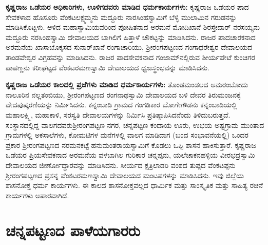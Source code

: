 \textbf{ಕೃಷ್ಣರಾಜ ಒಡೆಯರ ಅಧಿಕಾರಿಗಳು, ಊಳಿಗದವರು ಮಾಡಿದ ಧರ್ಮಕಾರ್ಯಗಳು: } ಕೃಷ್ಣರಾಜ ಒಡೆಯರ ಪಾದ ಸೇವಕಳಾದ ಹೊಸೂರು ವೆಂಕಟಲಕ್ಷ್ಮಮ್ಮನು ಮದ್ದೂರು ನಾರಸಿಂಹಸ್ವಾಮಿಗೆ ಬೆಳ್ಳಿ ಮುಲಾಮಿನ ಗರುಡನನ್ನು ಮಾಡಿಸಿ\-ಕೊಟ್ಟಳು. ಆಳಿದ ಮಹಾಸ್ವಾಮಿಯವರಿಂದ ಪೋಷಿತನಾದ ಅರಮನೆ ಮೋದಿಖಾನೆ ಶಿರಸ್ತೇದಾರ್​ ನರಸಯ್ಯನು ಮದ್ದೂರು ನರಸಿಂಹಸ್ವಾಮಿ ದೇವಾಲಯದ ಬಾಗಿಲಿಗೆ ಹಿತ್ತಾಳೆ ಚೌಕಟ್ಟನ್ನು ಮಾಡಿಸಿದನು. ರಾಜರ ಪಾದಚಾರಕನಾದ ಅರಮನೆಯ ಖಾಸಾಬೊಕ್ಕಸದ ಸುನಾರ್​ಖಾನೆ ರಂಗಾಚಾರಿಯು, ಶ‍್ರೀರಂಗಪಟ್ಟಣದ ಗಂಗಾಧರೇಶ್ವರ ದೇವಾಲಯದ ತಾಂಡವೇಶ್ವರ ವಿಗ್ರಹವನ್ನು ಮಾಡಿಸಿದನು. ರಾಜರ ಪಾದಸೇವಕನಾದ ಗಂಜಾಮ್‌ನಲ್ಲಿರುವ ಶೀರ್ಯಪೇಟೆ ಕುಂಚಿಗರ ಪಾಪಣ್ಣನು ಕರೀಘಟ್ಟದ ವೆಂಕಟರಮಣಸ್ವಾಮಿ ದೇವಾಲಯದ ಧ್ವಜಸ್ಥಂಭವನ್ನು ಮಾಡಿಸಿದನು.

\textbf{ಕೃಷ್ಣರಾಜ ಒಡೆಯರ ಕಾಲದಲ್ಲಿ ಪ್ರಜೆಗಳು ಮಾಡಿದ ಧರ್ಮಕಾರ್ಯಗಳು: } ತೊಂಡಮಂಡಲದ ಅಮರಂಬೋದು ನಾಲೂರಿನ ನಲ್ಲತಂಬಿಯು, ಶ‍್ರೀರಂಗಪಟ್ಟಣದ ರಂಗನಾಥಸ್ವಾಮಿ ದೇವಾಲಯದ ಬಳಿ ದೇವರ ತಿರುಮಂಜನಕ್ಕೆ ವೇದಪುಷ್ಕರಣಿ\-ಯನ್ನು ನಿರ್ಮಿಸಿದನು. ಕನ್ನಂಬಾಡಿ ಗ್ರಾಮದ ಗಂಗಡಿಕಾರ ಬೋಗೇಗೌಡನು ಕನ್ನಂಬಾಡಿಯಲ್ಲಿ ಮಹಾಲಕ್ಷ್ಮಿ, ಮಹಾಕಾಳಿ, ಸರಸ್ವತಿ ದೇವಾಲಯಗಳನ್ನು ನಿರ್ಮಿಸಿ ಪ್ರತಿಷ್ಠಾಪಿಸಿದನೆಂದು ತಿಳಿದುಬರುತ್ತದೆ. ಸಂಸ್ಥಾನದಲ್ಲಿದ್ದ ವಾಲಗದವರು\break ಶ‍್ರೀರಂಗಪಟ್ಟಣ ನಗರ, ಚನ್ನಪಟ್ಟಣ ಕಂದಾಯ ಊರು, ಉಭಯ ಅಷ್ಟಗ್ರಾಮ ಮುಂತಾದ ಗ್ರಾಮಗಳಲ್ಲಿ ಅಕಸಾಲೆಗಳು, ಕೋಮಟಿಗಳ ಮನೆಗಳಲ್ಲಿ ವಾಲಗ ಮಾಡಿದಾಗ (ಬಂದ ಸಂಭಾವನೆಯಲ್ಲಿ) ಒಂದರ ಪ್ರಕಾರ ಶ‍್ರೀರಂಗಪಟ್ಟಣದ ನರಮನಕಟ್ಟೆ ಹನುಮಂತರಾಯಸ್ವಾಮಿಗೆ ಕೊಡಲು ಒಪ್ಪಿ ಶಾಸನ ಹಾಕಿಸುತ್ತಾರೆ. ಕೃಷ್ಣರಾಜ ಒಡೆಯರ ಪ್ರಿಯಸೇವಕನಾದ ಅರಮನೆಯ ವಳಬಾಗಿಲ ಗುರಿಕಾರ ಚನ್ನಪ್ಪನು, ಯಲೆಚಾಕನಹಳ್ಳಿಯ ವೀರಭದ್ರಸ್ವಾಮಿ ದೇವಾಲಯದ ಜೀರ್ಣೋದ್ಧಾರವನ್ನು ಮಾಡಿಸಿ\-ದನು. ಸೀರ್ಯದ ಕ್ಷತ್ರಿಲಾಡರಿ ವಂಶದ ತುಪ್ಪದ ವೆಂಕಟಪ್ಪನು ಶ‍್ರೀರಂಗಪಟ್ಟಣದ ಪ್ರಸನ್ನ ವೆಂಕಟರಮಣಸ್ವಾಮಿ ದೇವಾಲಯದ ಮಂಟಪಗಳನ್ನು ಮಾಡಿಸಿದನು. ಇವು ಜಿಲ್ಲೆಯ ಶಾಸನೋಕ್ತ ಧರ್ಮ ಕಾರ್ಯಗಳು. ಈ ಕಾಲದ ಶಾಸನೋಕ್ತವಲ್ಲದ ಧಾರ್ಮಿಕ ಮತ್ತು ಸಾಂಸ್ಕೃತಿಕ ಮತ್ತು ಸಾಹಿತ್ಯ ರಚನೆ ಕಾರ್ಯಗಳು ಅಪಾರವಾಗಿದೆ.


\section{ಚನ್ನಪಟ್ಟಣದ ಪಾಳೆಯಗಾರರು}

